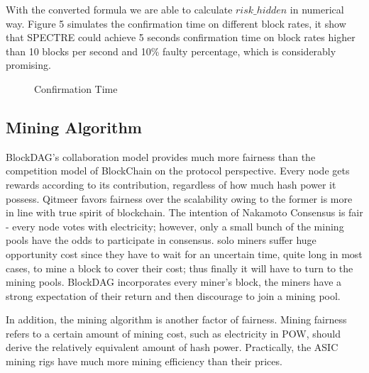 \documentclass[a4paper,11pt]{article}
\begin{document}
With the converted formula we are able to calculate $risk\_hidden$ in numerical way. Figure 5 simulates the confirmation time on different block rates, it show that SPECTRE could achieve 5 seconds confirmation time on block rates higher than 10 blocks per second and 10\% faulty percentage, which is considerably promising.

\begin{figure}[ht]
	\centerline{%
	}
\caption{Confirmation Time}
\end{figure}


\subsection{Mining Algorithm}
BlockDAG’s collaboration model provides much more fairness than the competition model of BlockChain on the protocol perspective. Every node gets rewards according to its contribution, regardless of how much hash power it possess. Qitmeer favors fairness over the scalability owing to the former is more in line with true spirit of blockchain. The intention of Nakamoto Consensus is fair - every node votes with electricity; however, only a small bunch of the mining pools have the odds to participate in consensus. solo miners suffer huge opportunity cost since they have to wait for an uncertain time, quite long in most cases, to mine a block to cover their cost; thus finally it will have to turn to the mining pools. BlockDAG incorporates every miner’s block, the miners have a strong expectation of their return and then discourage to join a mining pool.


In addition, the mining algorithm is  another factor of fairness. Mining fairness refers to a certain amount of mining cost, such as electricity in POW, should derive the relatively equivalent amount of hash power. Practically, the ASIC mining rigs have much more mining efficiency than their prices.
\end{document}
